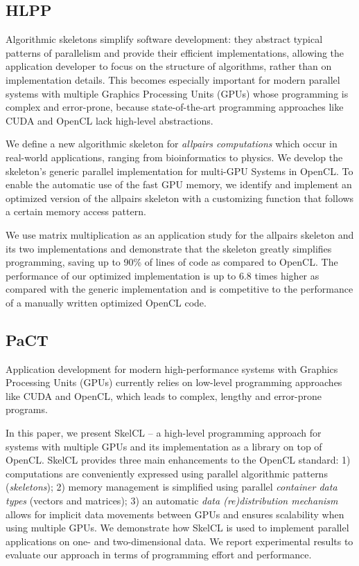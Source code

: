 \subsection{HLPP}
  Algorithmic skeletons simplify software development: they abstract typical patterns of parallelism and provide their efficient implementations, allowing the application developer to focus on the structure of algorithms, rather than on implementation details.
  This becomes especially important for modern parallel systems with multiple Graphics Processing Units (GPUs) whose programming is complex and error-prone, because state-of-the-art programming approaches like CUDA and OpenCL lack high-level abstractions.

  We define a new algorithmic skeleton for \emph{allpairs computations} which occur in real-world applications, ranging from bioinformatics to physics.
  We develop the skeleton's generic parallel implementation for multi-GPU Systems in OpenCL.
  To enable the automatic use of the fast GPU memory, we identify and implement an optimized version of the allpairs skeleton with a customizing function that follows a certain memory access pattern.
  
  We use matrix multiplication as an application study for the allpairs skeleton and its two implementations and demonstrate that the skeleton greatly simplifies programming, saving up to 90\% of lines of code as compared to OpenCL.
  The performance of our optimized implementation is up to 6.8 times higher as compared with the generic implementation and is competitive to the performance of a manually written optimized OpenCL code.


\subsection{PaCT}
Application development for modern high-performance systems with Graphics Processing Units (GPUs) currently relies on low-level programming approaches like CUDA and OpenCL, which leads to complex, lengthy and error-prone programs.

In this paper, we present SkelCL -- a high-level programming approach for systems with multiple GPUs and its implementation as a library on top of OpenCL.
SkelCL provides three main enhancements to the OpenCL standard:
1) computations are conveniently expressed using parallel algorithmic patterns (\emph{skeletons});
2) memory management is simplified using parallel \emph{container data types} (vectors and matrices);
3) an automatic \emph{data (re)distribution mechanism} allows for implicit data movements between GPUs and ensures scalability when using multiple GPUs.
We demonstrate how SkelCL is used to implement parallel applications on one- and two-dimensional data.
We report experimental results to evaluate our approach in terms of programming effort and performance.


